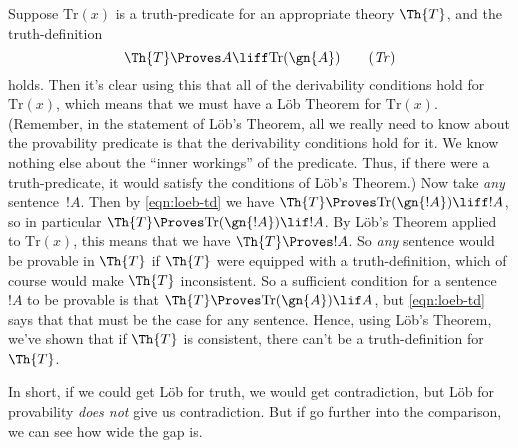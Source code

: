 Suppose $\mathrm{Tr}(x)$ is a truth-predicate for an appropriate
theory $\Th{T}$, and the truth-definition  
\begin{equation}\label{eqn:loeb-td}
\Th{T}\Proves A \liff \mathrm{Tr}(\gn{A})\tag{\textit{Tr}}
\end{equation}
holds. Then it's clear using this that all of the derivability
conditions hold for $\mathrm{Tr}(x)$, which means that we must have a
L\"ob Theorem for $\mathrm{Tr}(x)$. (Remember, in the statement of
L\"ob's Theorem, all we really need to know about the provability
predicate is that the derivability conditions hold for it. We know
nothing else about the ``inner workings'' of the predicate. Thus, if
there were a truth-predicate, it would satisfy the conditions of
L\"ob's Theorem.) Now take \textit{any} sentence~$!A$. Then by
\eqref{eqn:loeb-td} we have $\Th{T} \Proves \mathrm{Tr}(\gn{!A}) \liff
!A$, so in particular $\Th{T} \Proves \mathrm{Tr}(\gn{!A}) \lif !A$.
By L\"ob's Theorem applied to $\mathrm{Tr}(x)$, this means that we
have $\Th{T} \Proves !A$. So \emph{any} sentence would be provable in
$\Th{T}$ if $\Th{T}$ were equipped with a truth-definition, which of
course would make $\Th{T}$ inconsistent. So a sufficient condition for
a sentence~$!A$ to be provable is that $\Th{T} \Proves
\mathrm{Tr}(\gn{A}) \lif A$, but \eqref{eqn:loeb-td} says that that
must be the case for any sentence.
Hence,  using L\"ob's Theorem, we've shown that if $\Th{T}$ is
consistent, there can't be a truth-definition for~$\Th{T}$. 

In short, if we could get L\"ob for truth, we would get contradiction,
but L\"ob for provability \emph{does not} give us contradiction. But
if go further into the comparison, we can see  how wide the gap is. 

